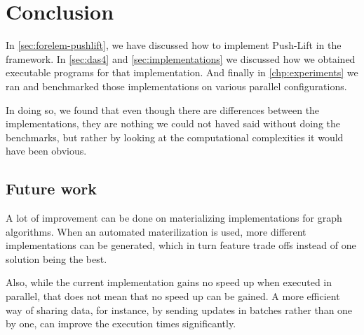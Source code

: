 \chapter{Conclusion}

In \autoref{sec:forelem-pushlift}, we have discussed how to implement Push-Lift in the \forelem framework. In \autoref{sec:das4} and \autoref{sec:implementations} we discussed how we obtained executable programs for that implementation. And finally in \autoref{chp:experiments} we ran and benchmarked those implementations on various parallel configurations.

In doing so, we found that even though there are differences between the implementations, they are nothing we could not haved said without doing the benchmarks, but rather by looking at the computational complexities it would have been obvious.

\section{Future work}

A lot of improvement can be done on materializing implementations for graph algorithms. When an automated materilization is used, more different implementations can be generated, which in turn feature trade offs instead of one solution being the best.

Also, while the current implementation gains no speed up when executed in parallel, that does not mean that no speed up can be gained. A more efficient way of sharing data, for instance, by sending updates in batches rather than one by one, can improve the execution times significantly.